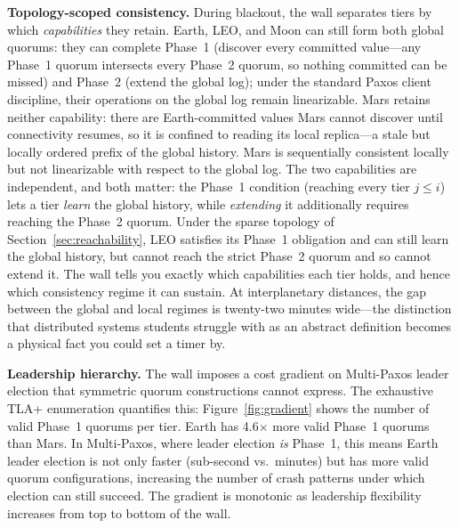 \documentclass[11pt]{article}
\begin{document}
\textbf{Topology-scoped consistency.} During blackout, the wall separates tiers by which \emph{capabilities} they retain. Earth, LEO, and Moon can still form both global quorums: they can complete Phase~1 (discover every committed value---any Phase~1 quorum intersects every Phase~2 quorum, so nothing committed can be missed) and Phase~2 (extend the global log); under the standard Paxos client discipline, their operations on the global log remain linearizable. Mars retains neither capability: there are Earth-committed values Mars cannot discover until connectivity resumes, so it is confined to reading its local replica---a stale but locally ordered prefix of the global history. Mars is sequentially consistent locally but not linearizable with respect to the global log. The two capabilities are independent, and both matter: the Phase~1 condition (reaching every tier $j \le i$) lets a tier \emph{learn} the global history, while \emph{extending} it additionally requires reaching the Phase~2 quorum. Under the sparse topology of Section~\ref{sec:reachability}, LEO satisfies its Phase~1 obligation and can still learn the global history, but cannot reach the strict Phase~2 quorum and so cannot extend it. The wall tells you exactly which capabilities each tier holds, and hence which consistency regime it can sustain. At interplanetary distances, the gap between the global and local regimes is twenty-two minutes wide---the distinction that distributed systems students struggle with as an abstract definition becomes a physical fact you could set a timer by.

\textbf{Leadership hierarchy.} The wall imposes a cost gradient on Multi-Paxos leader election that symmetric quorum constructions cannot express. The exhaustive TLA+ enumeration quantifies this: Figure~\ref{fig:gradient} shows the number of valid Phase~1 quorums per tier. Earth has 4.6$\times$ more valid Phase~1 quorums than Mars. In Multi-Paxos, where leader election \emph{is} Phase~1, this means Earth leader election is not only faster (sub-second vs.\ minutes) but has more valid quorum configurations, increasing the number of crash patterns under which election can still succeed. The gradient is monotonic as leadership flexibility increases from top to bottom of the wall.
\end{document}
